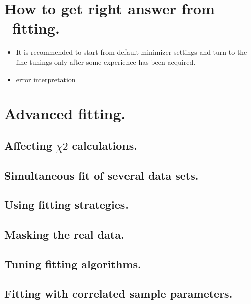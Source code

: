 %
\section {How to get right answer from \BornAgain\ fitting.} 

\begin{itemize}
\item It is recommended to start from default minimizer settings and turn to the fine tunings
only after some experience has been acquired.
\item error interpretation

\end{itemize}


% 
\section {Advanced fitting.} 

\subsection{Affecting $\chi2$ calculations.}
\subsection{Simultaneous fit of several data sets.}
\subsection{Using fitting strategies.}
\subsection{Masking the real data.}
\subsection{Tuning fitting algorithms.}
\subsection{Fitting with correlated sample parameters.}




